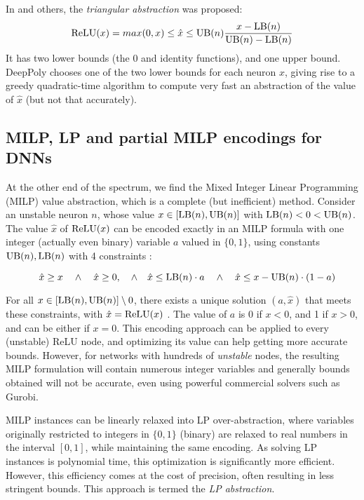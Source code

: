 {\color{blue} In \cite{DBLP_Ehlers17, deeppoly} and others, the {\em triangular abstraction} was proposed:
\begin{align}
	\mathrm{ReLU}(x) = max (0,x) \leq \hat{x} \leq \mathrm{UB}(n) \frac{x-\mathrm{LB}(n)}{\mathrm{UB}(n)-\mathrm{LB}(n)} 
	\label{eq:deeppoly}
\end{align} 
It has two lower bounds (the 0 and identity functions), and one upper bound. 
DeepPoly \cite{deeppoly} chooses one of the two lower bounds for each neuron $x$, giving rise to a greedy quadratic-time algorithm to compute very fast an abstraction of the value of $\hat{x}$ (but not that accurately).
}


\subsection{MILP, LP and partial MILP encodings for DNNs}

At the other end of the spectrum, we find the Mixed Integer Linear Programming (MILP) value abstraction, which is a complete (but inefficient) method. 
Consider an unstable neuron $n$, whose value $x \in [\mathrm{LB}(n),\mathrm{UB}(n)]$ with $\mathrm{LB}(n)<0<\mathrm{UB}(n)$.
The value $\hat{x}$ of $\mathrm{ReLU}(x)$ can be encoded exactly in an MILP formula with one 
integer (actually even binary) variable $a$ valued in $\{0,1\}$, using constants $\mathrm{UB}(n),\mathrm{LB}(n)$ with 4 constraints \cite{MILP}:

\vspace{-0.4cm}
\begin{equation}\quad \hat{x} \geq x \quad \wedge \quad \hat{x} \geq 0, \quad \wedge \quad \hat{x} \leq \mathrm{LB}(n) \cdot a \quad \wedge \quad \hat{x} \leq x-\mathrm{UB}(n) \cdot (1-a)
\label{eq11}
\end{equation}

For all $x \in [\mathrm{LB}(n),\mathrm{UB}(n)] \setminus 0$, there exists a unique solution $(a,\hat{x})$ that meets these constraints, with $\hat{x}=\mathrm{ReLU}(x)$ \cite{MILP}. The value of $a$ is 0 if $x < 0$, and 1 if $x>0$, and can be either if $x=0$. This encoding approach can be applied to every (unstable) ReLU node, and optimizing its value can help getting more accurate bounds. However, for networks with hundreds of {\em unstable} nodes, the resulting MILP formulation will contain numerous integer variables and generally bounds obtained will not be accurate, even using powerful commercial solvers such as Gurobi.

MILP instances can be linearly relaxed into LP over-abstraction, where variables originally restricted to integers in $\{0,1\}$ (binary) are relaxed to real numbers in the interval $[0,1]$, while maintaining the same encoding. As solving LP instances is polynomial time, this optimization is significantly more efficient. However, this efficiency comes at the cost of precision, often resulting in less stringent bounds. This approach is termed the {\em LP abstraction}.

